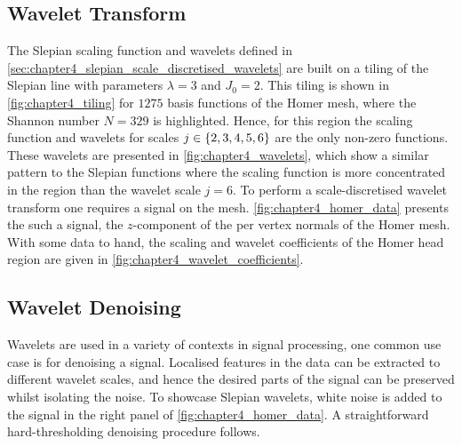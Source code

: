 

\subsection{Wavelet Transform}\label{sec:chapter4_wavelet_transform}

The Slepian scaling function and wavelets defined in \cref{sec:chapter4_slepian_scale_discretised_wavelets} are built on a tiling of the Slepian line with parameters \(\lambda=3\) and \(J_{0}=2\).
This tiling is shown in \cref{fig:chapter4_tiling} for \(\num{1275}\) basis functions of the Homer mesh, where the Shannon number \(N=329\) is highlighted.
Hence, for this region the scaling function and wavelets for scales \(j \in \{2, 3, 4, 5, 6\}\) are the only non-zero functions.
These wavelets are presented in \cref{fig:chapter4_wavelets}, which show a similar pattern to the Slepian functions where the scaling function is more concentrated in the region than the wavelet scale \(j=6\).
To perform a scale-discretised wavelet transform one requires a signal on the mesh.
\cref{fig:chapter4_homer_data} presents the such a signal, the \(z\)-component of the per vertex normals of the Homer mesh.
With some data to hand, the scaling and wavelet coefficients of the Homer head region are given in \cref{fig:chapter4_wavelet_coefficients}.







\subsection{Wavelet Denoising}\label{sec:chapter4_wavelet_denoising}

Wavelets are used in a variety of contexts in signal processing, one common use case is for denoising a signal.
Localised features in the data can be extracted to different wavelet scales, and hence the desired parts of the signal can be preserved whilst isolating the noise.
To showcase Slepian wavelets, white noise is added to the signal in the right panel of \cref{fig:chapter4_homer_data}.
A straightforward hard-thresholding denoising procedure follows.

